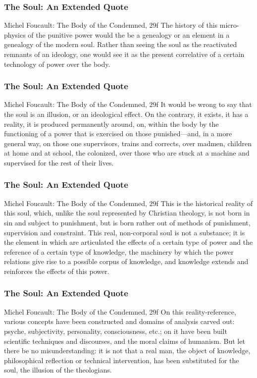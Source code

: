 \documentclass[xcolor=dvipsnames]{beamer}
\begin{document}
\begin{frame}
  \frametitle{The Soul: An Extended Quote}
  \begin{block}{Michel Foucault: The Body of the Condemned, 29f}
    The history of this micro-physics of the punitive power would the
    be a genealogy or an element in a genealogy of the modern soul.
    Rather than seeing the soul as the reactivated remnants of an
    ideology, one would see it as the present correlative of a certain
    technology of power over the body. 
  \end{block}
\end{frame}

\begin{frame}
  \frametitle{The Soul: An Extended Quote}
  \begin{block}{Michel Foucault: The Body of the Condemned, 29f}
    It would be wrong to say that the soul is an illusion, or an
    ideological effect. On the contrary, it exists, it has a reality,
    it is produced permanently around, on, within the body by the
    functioning of a power that is exercised on those punished---and,
    in a more general way, on those one supervisors, trains and
    corrects, over madmen, children at home and at school, the
    colonized, over those who are stuck at a machine and supervised
    for the rest of their lives.
  \end{block}
\end{frame}

\begin{frame}
  \frametitle{The Soul: An Extended Quote}
  \begin{block}{Michel Foucault: The Body of the Condemned, 29f}
    This is the historical reality of this soul, which, unlike the
    soul represented by Christian theology, is not born in sin and
    subject to punishment, but is born rather out of methods of
    punishment, supervision and constraint. This real, non-corporal
    soul is not a substance; it is the element in which are
    articulated the effects of a certain type of power and the
    reference of a certain type of knowledge, the machinery by which
    the power relations give rise to a possible corpus of knowledge,
    and knowledge extends and reinforces the effects of this power.
  \end{block}
\end{frame}

\begin{frame}
  \frametitle{The Soul: An Extended Quote}
  \begin{block}{Michel Foucault: The Body of the Condemned, 29f}
    On this reality-reference, various concepts have been constructed
    and domains of analysis carved out: psyche, subjectivity,
    personality, consciousness, etc.; on it have been built scientific
    techniques and discourses, and the moral claims of humanism. But
    let there be no misunderstanding: it is not that a real man, the
    object of knowledge, philosophical reflection or technical
    intervention, has been substituted for the soul, the illusion of
    the theologians.
  \end{block}
\end{frame}
\end{document}
